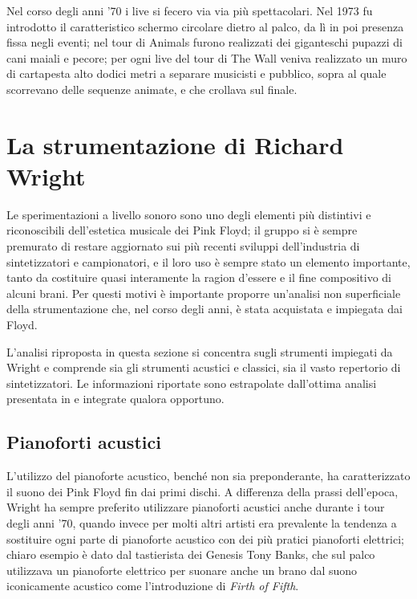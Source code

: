 \documentclass[class=book, crop=false, oneside, 12pt]{standalone}
\begin{document}
    Nel corso degli anni '70 i live si fecero via via più spettacolari. Nel 1973 fu introdotto il caratteristico schermo circolare dietro al palco, da lì in poi presenza fissa negli eventi; nel tour di Animals furono realizzati dei giganteschi pupazzi di cani maiali e pecore; per ogni live del tour di The Wall veniva realizzato un muro di cartapesta alto dodici metri a separare musicisti e pubblico, sopra al quale scorrevano delle sequenze animate, e che crollava sul finale.



    \section{La strumentazione di Richard Wright}\label{sec:01-gear}
    Le sperimentazioni a livello sonoro sono uno degli elementi più distintivi e riconoscibili dell'estetica musicale dei Pink Floyd; il gruppo si è sempre premurato di restare aggiornato sui più recenti sviluppi dell'industria di sintetizzatori e campionatori, e il loro uso è sempre stato un elemento importante, tanto da costituire quasi interamente la ragion d'essere e il fine compositivo di alcuni brani. Per questi motivi è importante proporre un'analisi non superficiale della strumentazione che, nel corso degli anni, è stata acquistata e impiegata dai Floyd.

    L'analisi riproposta in questa sezione si concentra sugli strumenti impiegati da Wright e comprende sia gli strumenti acustici e classici, sia il vasto repertorio di sintetizzatori. Le informazioni riportate sono estrapolate dall'ottima analisi presentata in \cite{azimuth2004gear} e integrate qualora opportuno.
    
    \subsection{Pianoforti acustici}
    L'utilizzo del pianoforte acustico, benché non sia preponderante, ha caratterizzato il suono dei Pink Floyd fin dai primi dischi. A differenza della prassi dell'epoca, Wright ha sempre preferito utilizzare pianoforti acustici anche durante i tour degli anni '70, quando invece per molti altri artisti era prevalente la tendenza a sostituire ogni parte di pianoforte acustico con dei più pratici pianoforti elettrici; chiaro esempio è dato dal tastierista dei Genesis Tony Banks, che sul palco utilizzava un pianoforte elettrico per suonare anche un brano dal suono iconicamente acustico come l'introduzione  di \emph{Firth of Fifth}. 
    
\end{document}
